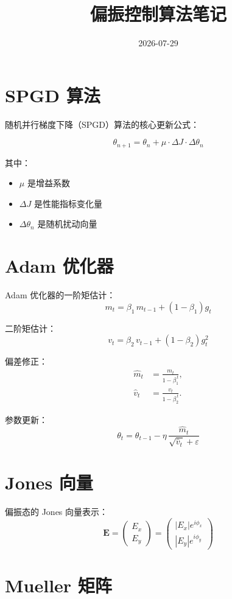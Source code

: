 \documentclass{article}
\title{偏振控制算法笔记}
\date{2026-07-29}
\begin{document}
\maketitle

\section{SPGD 算法}

随机并行梯度下降（SPGD）算法的核心更新公式：

\[
\theta_{n+1} = \theta_n + \mu \cdot \Delta J \cdot \Delta\theta_n
\]

其中：
\begin{itemize}
\item $\mu$ 是增益系数
\item $\Delta J$ 是性能指标变化量
\item $\Delta\theta_n$ 是随机扰动向量
\end{itemize}

\section{Adam 优化器}

Adam 优化器的一阶矩估计：
\[
m_t = \beta_{1}\,m_{t-1} + \left(1-\beta_{1}\right)g_t
\]

二阶矩估计：
\[
v_t = \beta_{2}\,v_{t-1} + \left(1-\beta_{2}\right)g_t^2
\]

偏差修正：
\[
\begin{aligned}
\hat{m}_t &= \frac{m_t}{1-\beta_{1}^{\,t}}, \\
\hat{v}_t &= \frac{v_t}{1-\beta_{2}^{\,t}}.
\end{aligned}
\]

参数更新：
\[
\theta_t = \theta_{t-1} - \eta\,\frac{\hat{m}_t}{\sqrt{\hat{v}_t} + \varepsilon}
\]

\section{Jones 向量}

偏振态的 Jones 向量表示：
\[
\mathbf{E} = \begin{pmatrix} E_x \\ E_y \end{pmatrix} = \begin{pmatrix} |E_x| e^{i\phi_x} \\ |E_y| e^{i\phi_y} \end{pmatrix}
\]

\section{Mueller 矩阵}
\end{document}
